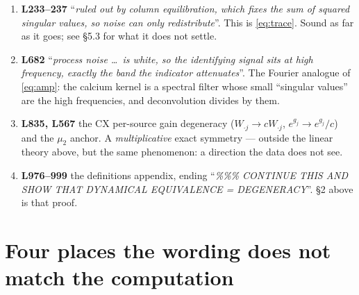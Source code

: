 \documentclass[11pt]{article}
\begin{document}
\begin{enumerate}
\item \textbf{L233--237} ``\emph{ruled out by column equilibration, which fixes
the sum of squared singular values, so noise can only redistribute}''. This is
\eqref{eq:trace}. Sound as far as it goes; see §5.3 for what it does not settle.

\item \textbf{L682} ``\emph{process noise \dots\ is white, so the identifying
signal sits at high frequency, exactly the band the indicator attenuates}''.
The Fourier analogue of \eqref{eq:amp}: the calcium kernel is a spectral filter
whose small ``singular values'' are the high frequencies, and deconvolution
divides by them.

\item \textbf{L835, L567} the CX per-source gain degeneracy
($W_{\cdot j}\to cW_{\cdot j}$, $e^{g_j}\to e^{g_j}/c$) and the $\mu_2$ anchor.
A \emph{multiplicative} exact symmetry --- outside the linear theory above,
but the same phenomenon: a direction the data does not see.

\item \textbf{L976--999} the definitions appendix, ending
``\emph{\%\%\% CONTINUE THIS AND SHOW THAT DYNAMICAL EQUIVALENCE = DEGENERACY}''.
§2 above is that proof.
\end{enumerate}

\section{Four places the wording does not match the computation}
\label{sec:flags}
\end{document}
